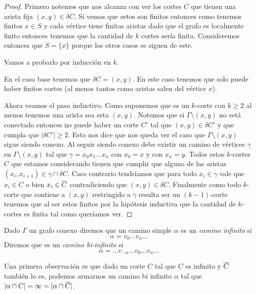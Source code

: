 \documentclass[tesis.tex]{subfiles}
\begin{document}
\begin{proof}
	Primero notemos que nos alcanza con ver los cortes $C$ que tienen una arista fija $(x,y) \in \delta C$.
	Si vemos que estos son finitos entonces como tenemos finitos $x \in S$ y cada vértice tiene finitas aristas dado que el grafo es localmente finito entonces tenemos que la cantidad de $k$ cortes sería finita.
	Consideremos entonces que $S = \{ x \}$ porque los otros casos se siguen de este.
	
	Vamos a probarlo por inducción en $k$.
	
	En el caso base tenemos que $\delta C = (x,y)$.
	En este caso tenemos que solo puede haber finitos cortes (al menos tantos como aristas salen del vértice $x$).
	
	Ahora veamos el paso inductivo.
	Como suponemos que es un $k$-corte con $k \ge 2$ al menos tenemos una arista sea esta $(x,y)$.
	Notemos que si $\Gamma \setminus (x,y)$ no está conectado entonces no puede haber un corte $C'$ tal que $(x,y) \in \delta C'$ y que cumpla que $|\delta C'| \ge 2$.
	Esto nos dice que nos queda ver el caso que $\Gamma \setminus (x,y)$ sigue siendo conexo. 
	Al seguir siendo conexo debe existir un camino de vértices $\gamma$  en $ \Gamma \setminus (x,y) $ tal que $\gamma = x_0 x_1 \dots x_{n}$ con $x_0 = x$ y con $x_{n} = y$.
	Todos estos $k$-cortes $C$ que estamos considerando tienen que cumplir que alguno de las aristas $(x_i,x_{i+1}) \in  \gamma \cap \delta C$.
	Caso contrario tendríamos que para todo $x_i \in \gamma$ vale que $x_{i} \in C$ o bien $x_i \in \overline C$ contradiciendo que $(x,y) \in \delta C$.
	Finalmente como todo $k$-corte que contiene a $(x,y)$ restringido a $\gamma$ resulta ser un $(k-1)$-corte tenemos que al ser estos finitos por la hipótesis inductiva que la cantidad de $k$-cortes es finita tal como queríamos ver.
	
\end{proof}
	
\begin{deff}
	Dado $\Gamma$ un grafo conexo diremos que un camino simple $\alpha$ es un \emph{camino infinito }si
	\[
		\alpha = v_0 \dots v_{n} \dots
	\]	
	Diremos que es un \emph{camino bi-infinito } si
	\[
		\alpha =  \dots v_{-n} \dots v_0 \dots v_{n} \dots 
	\]
\end{deff}	
	

Una primera observación es que dado un corte $C$ tal que $C$ es infinito y $\overline C$ también lo es, podemos armarnos un camino bi infinito $\alpha$ tal que $|\alpha \cap C| = \infty = |\alpha \cap \overline C|$.
\end{document}
